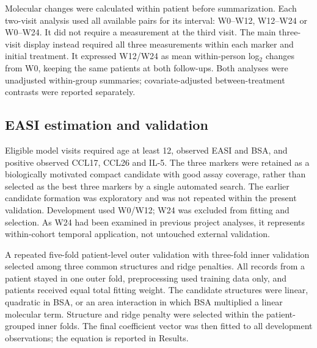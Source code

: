 Molecular changes were calculated within patient before summarization. Each two-visit analysis used all available pairs for its interval: W0--W12, W12--W24 or W0--W24. It did not require a measurement at the third visit. The main three-visit display instead required all three measurements within each marker and initial treatment. It expressed W12/W24 as mean within-person log$_2$ changes from W0, keeping the same patients at both follow-ups. Both analyses were unadjusted within-group summaries; covariate-adjusted between-treatment contrasts were reported separately.

\subsection{EASI estimation and validation}
Eligible model visits required age at least 12, observed EASI and BSA, and positive observed CCL17, CCL26 and IL-5. The three markers were retained as a biologically motivated compact candidate with good assay coverage, rather than selected as the best three markers by a single automated search. The earlier candidate formation was exploratory and was not repeated within the present validation. Development used W0/W12; W24 was excluded from fitting and selection. As W24 had been examined in previous project analyses, it represents within-cohort temporal application, not untouched external validation.

A repeated five-fold patient-level outer validation with three-fold inner validation selected among three common structures and ridge penalties. All records from a patient stayed in one outer fold, preprocessing used training data only, and patients received equal total fitting weight. The candidate structures were linear, quadratic in BSA, or an area interaction in which BSA multiplied a linear molecular term. Structure and ridge penalty were selected within the patient-grouped inner folds. The final coefficient vector was then fitted to all development observations; the equation is reported in Results.

